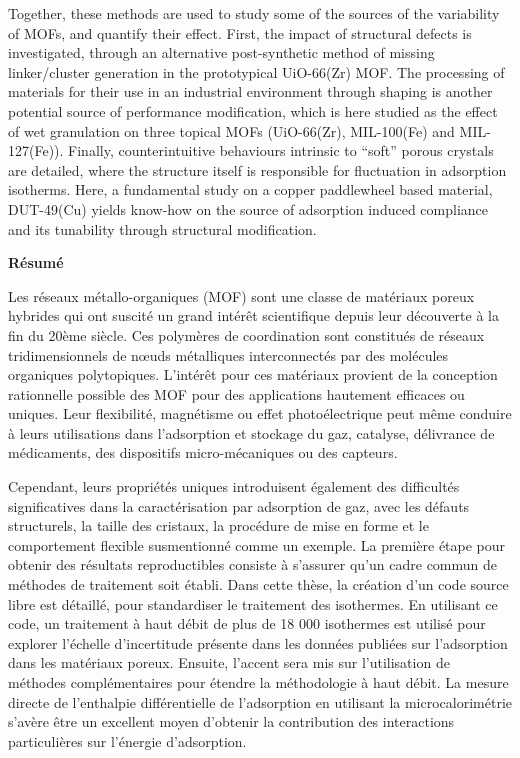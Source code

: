 \begin{minipage}{\textwidth}
{Together, these methods are used to study some of the sources 
of the variability of \gls{MOF}s, and quantify their effect.
First, the impact of structural defects is investigated, through an
alternative post-synthetic method of missing linker/cluster generation
in the prototypical UiO-66(Zr) \gls{MOF}. The processing of 
materials for their use in an industrial environment through 
shaping is another potential source of performance modification,
which is here studied as the effect of wet granulation on
three topical \gls{MOF}s (UiO-66(Zr), MIL-100(Fe) and MIL-127(Fe)). 
Finally, counterintuitive behaviours intrinsic to
``soft'' porous crystals are detailed, where the structure itself 
is responsible for fluctuation in adsorption isotherms. Here,
a fundamental study on a copper paddlewheel based material, DUT-49(Cu)
yields know-how on the source of adsorption induced compliance
and its tunability through structural modification.

\vspace{1cm}

{\normalsize\noindent\textbf{Résumé}}

\noindent\makebox[\linewidth]{\rule{\linewidth}{0.4pt}}

Les réseaux métallo-organiques (MOF) sont une classe de matériaux poreux
hybrides qui ont suscité un grand intérêt scientifique depuis leur 
découverte à la fin du 20ème siècle. Ces polymères de coordination sont 
constitués de réseaux tridimensionnels de nœuds métalliques interconnectés 
par des molécules organiques polytopiques. L'intérêt pour ces matériaux 
provient de la conception rationnelle possible des MOF pour des 
applications hautement efficaces ou uniques.
Leur flexibilité, magnétisme ou effet photoélectrique
peut même conduire à leurs utilisations dans l'adsorption et stockage du
gaz, catalyse, délivrance de médicaments, des dispositifs micro-mécaniques
ou des capteurs.

Cependant, leurs propriétés uniques introduisent également des difficultés
significatives dans la caractérisation par adsorption de gaz, avec les 
défauts structurels, la taille des cristaux, la procédure de mise 
en forme et le comportement flexible susmentionné comme un exemple. 
La première étape pour obtenir des résultats reproductibles consiste 
à s'assurer qu'un cadre commun de méthodes de traitement 
soit établi. Dans cette thèse, la création d'un code source 
libre est détaillé, 
pour standardiser le traitement des isothermes. En utilisant ce code, 
un traitement à haut débit de plus de 18 000 isothermes est 
utilisé pour explorer l'échelle d'incertitude présente dans les 
données publiées sur l'adsorption dans les matériaux poreux.
Ensuite, l'accent sera mis sur l'utilisation de méthodes complémentaires 
pour étendre la méthodologie à haut débit. La mesure directe de 
l'enthalpie différentielle de l'adsorption en utilisant la
microcalorimétrie s'avère être un excellent 
moyen d'obtenir la contribution des interactions particulières sur
l'énergie d'adsorption.

}
\end{minipage}
